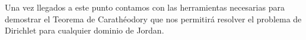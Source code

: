 \begin{comment} %
\begin{prop}
    Sea $U \subset \complex$. Una aplicación $f: U \to \complex$ es conforme en $U$ si satisface las condiciones de Cauchy-Riemann y $f'(z) \not = 0$ para todo $z \in U$.
\end{prop}

\begin{proof}
    Sea $f$ una función continua tal que $f(z) = u(x,y) + i v(x,y), \, z = x+iv$. Sabemos, por hipótesis, que $u(x,y)$ y $v(x,y)$ son funciones continuamente diferenciables. \\

    Consideremos la curva suave $\gamma : [a,b] \to U$, que escribimos como $\gamma (t) = \rho (t) + i \sigma (t)$. Entonces,
    \begin{equation*}
        f(\gamma (t)) = u(\rho (t), \sigma (t)) + i v(\rho (t), \sigma (t)).
    \end{equation*}

    Como $f(\gamma (t))$ es continuamente diferenciable,
    \begin{equation}
        \label{eq:cauchy-riemann}
        \frac{d}{dt}f(\gamma (t)) = u_x \rho' (t) + u_y \sigma' (t) + i (v_x \rho'(t) + v_y \sigma'(t)).
    \end{equation}

    Por hipótesis tenemos que
    \begin{equation*}
        \frac{\partial (u,v)}{\partial (x,y)} =
        \left|
        \begin{matrix}
            u_x(x,y) & u_y(x,y) \\ v_x(x,y) & v_y(x,y)
        \end{matrix}
        \right| \not = 0,
    \end{equation*}
    por lo que $\frac{d}{dt} f(\gamma (t)) \not = 0$ en $t = 0$ pues $\rho' (t) + i \sigma' (t) = \gamma' (t) \not = 0$. Es decir, la curva $f (\gamma)$ es suave en un entorno de su origen. Por lo tanto, si $\gamma_1$ y $\gamma_2$ son curvas suaves con origen $c$, el ángulo entre $f(\gamma_1)$ y $f(\gamma_2)$ en $f(c)$ está bien definido. \\
\end{proof}
\end{comment}

Una vez llegados a este punto contamos con las herramientas necesarias para demostrar el Teorema de Carathéodory que nos permitirá resolver el problema de Dirichlet para cualquier dominio de Jordan. \\

